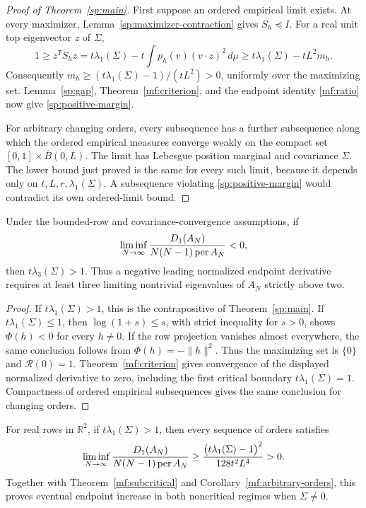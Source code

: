\begin{proof}[Proof of Theorem~\ref{sp:main}]
First suppose an ordered empirical limit exists. At every maximizer,
Lemma~\ref{sp:maximizer-contraction} gives \(S_h\preceq I\).
For a real unit top eigenvector \(z\) of \(\Sigma\),
\[
 1\ge z^TS_hz
 =t\lambda_1(\Sigma)-t\int p_h(v)(v\cdot z)^2\,d\mu
 \ge t\lambda_1(\Sigma)-tL^2m_h.
\]
Consequently
\(m_h\ge(t\lambda_1(\Sigma)-1)/(tL^2)>0\), uniformly over the
maximizing set. Lemma~\ref{sp:gap}, Theorem~\ref{mf:criterion}, and
the endpoint identity \eqref{mf:ratio} now give
\eqref{sp:positive-margin}.

For arbitrary changing orders, every subsequence has a further
subsequence along which the ordered empirical measures converge
weakly on the compact set \([0,1]\times\overline B(0,L)\).
The limit has Lebesgue position marginal and covariance \(\Sigma\).
The lower bound just proved is the same for every such limit, because
it depends only on \(t,L,r,\lambda_1(\Sigma)\). A subsequence
violating \eqref{sp:positive-margin} would contradict its own
ordered-limit bound.
\end{proof}

\begin{corollary}
\label{sp:negative-necessity}
Under the bounded-row and covariance-convergence assumptions, if
\[
 \liminf_{N\to\infty}
 \frac{D_1(A_N)}{N(N-1)\operatorname{per} A_N}<0,
\]
then \(t\lambda_3(\Sigma)>1\). Thus a negative leading normalized
endpoint derivative requires at least three limiting nontrivial
eigenvalues of \(A_N\) strictly above two.
\end{corollary}
\begin{proof}
If \(t\lambda_1(\Sigma)>1\), this is the contrapositive of
Theorem~\ref{sp:main}. If \(t\lambda_1(\Sigma)\le1\), then
\(\log(1+s)\le s\), with strict inequality for \(s>0\), shows
\(\Phi(h)<0\) for every \(h\ne0\). If the row projection vanishes
almost everywhere, the same conclusion follows from
\(\Phi(h)=-\|h\|^2\). Thus the maximizing set is \(\{0\}\) and
\(\mathcal R(0)=1\). Theorem~\ref{mf:criterion} gives convergence
of the displayed normalized derivative to zero, including the first
critical boundary \(t\lambda_1(\Sigma)=1\). Compactness of ordered
empirical subsequences gives the same conclusion for changing orders.
\end{proof}

\begin{corollary}\label{sp:rank-two}
For real rows in \(\mathbb R^2\), if \(t\lambda_1(\Sigma)>1\),
then every sequence of orders satisfies
\[
 \liminf_{N\to\infty}
 \frac{D_1(A_N)}{N(N-1)\operatorname{per} A_N}
 \ge\frac{\bigl(t\lambda_1(\Sigma)-1\bigr)^2}{128t^2L^4}>0.
\]
Together with Theorem~\ref{mf:subcritical} and
Corollary~\ref{mf:arbitrary-orders}, this proves eventual endpoint
increase in both noncritical regimes when \(\Sigma\ne0\).
\end{corollary}


